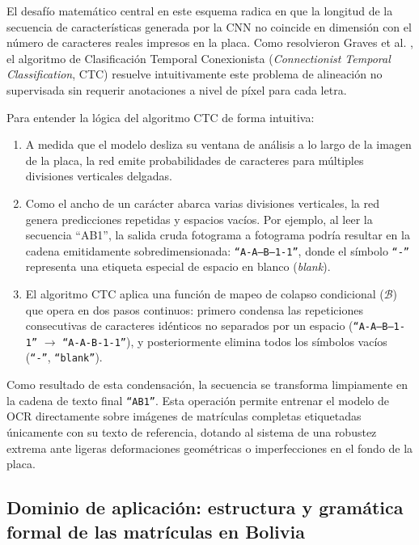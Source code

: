 El desafío matemático central en este esquema radica en que la longitud de la
secuencia de características generada por la CNN no coincide en dimensión con el
número de caracteres reales impresos en la placa. Como resolvieron Graves et al.
\cite{graves2006ctc}, el algoritmo de Clasificación Temporal Conexionista
(\textit{Connectionist Temporal Classification}, CTC) resuelve intuitivamente
este problema de alineación no supervisada sin requerir anotaciones a nivel de
píxel para cada letra.

Para entender la lógica del algoritmo CTC de forma intuitiva:
\begin{enumerate}
    \item A medida que el modelo desliza su ventana de análisis a lo largo de la
        imagen de la placa, la red emite probabilidades de caracteres para
        múltiples divisiones verticales delgadas.

    \item Como el ancho de un carácter abarca varias divisiones verticales, la
        red genera predicciones repetidas y espacios vacíos. Por ejemplo, al
        leer la secuencia ``AB1'', la salida cruda fotograma a fotograma podría
        resultar en la cadena emitidamente sobredimensionada:
        \texttt{``A-A--B---1-1''}, donde el símbolo \texttt{``-''} representa una
        etiqueta especial de espacio en blanco (\textit{blank}).

    \item El algoritmo CTC aplica una función de mapeo de colapso condicional
        ($\mathcal{B}$) que opera en dos pasos continuos: primero condensa las
        repeticiones consecutivas de caracteres idénticos no separados por un
        espacio (\texttt{``A-A--B---1-1''} $\rightarrow$ \texttt{``A-A-B-1-1''}), y
        posteriormente elimina todos los símbolos vacíos (\texttt{``-''},
        \texttt{``blank''}).
\end{enumerate}

Como resultado de esta condensación, la secuencia se transforma limpiamente en
la cadena de texto final \texttt{``AB1''}. Esta operación permite entrenar el
modelo de OCR directamente sobre imágenes de matrículas completas etiquetadas
únicamente con su texto de referencia, dotando al sistema de una robustez
extrema ante ligeras deformaciones geométricas o imperfecciones en el fondo de
la placa.

\subsection{Dominio de aplicación: estructura y gramática formal de las
matrículas en Bolivia}

